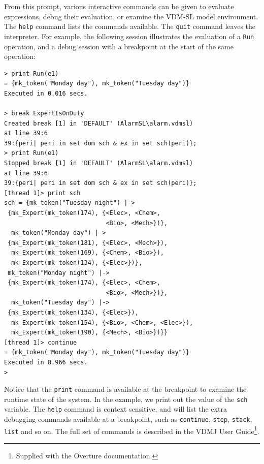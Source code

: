 {\noindent From this prompt, various interactive commands can be given
to evaluate expressions, debug their evaluation, or examine the
VDM-SL model environment.  The \verb|help| command lists the commands
available. The \verb|quit| command leaves the interpreter.
For example, the following session illustrates the evaluation of a
\verb|Run| operation, and a debug session with a breakpoint at the
start of the same operation:

\begin{lstlisting}
> print Run(e1)
= {mk_token("Monday day"), mk_token("Tuesday day")}
Executed in 0.016 secs.

> break ExpertIsOnDuty
Created break [1] in 'DEFAULT' (AlarmSL\alarm.vdmsl) 
at line 39:6
39:{peri| peri in set dom sch & ex in set sch(peri)};
> print Run(e1)
Stopped break [1] in 'DEFAULT' (AlarmSL\alarm.vdmsl) 
at line 39:6
39:{peri| peri in set dom sch & ex in set sch(peri)};
[thread 1]> print sch
sch = {mk_token("Tuesday night") |->
 {mk_Expert(mk_token(174), {<Elec>, <Chem>, 
                            <Bio>, <Mech>})},
  mk_token("Monday day") |->
 {mk_Expert(mk_token(181), {<Elec>, <Mech>}),
  mk_Expert(mk_token(169), {<Chem>, <Bio>}),
  mk_Expert(mk_token(134), {<Elec>})},
 mk_token("Monday night") |->
 {mk_Expert(mk_token(174), {<Elec>, <Chem>, 
                            <Bio>, <Mech>})},
  mk_token("Tuesday day") |->
 {mk_Expert(mk_token(134), {<Elec>}),
  mk_Expert(mk_token(154), {<Bio>, <Chem>, <Elec>}),
  mk_Expert(mk_token(190), {<Mech>, <Bio>})}}
[thread 1]> continue
= {mk_token("Monday day"), mk_token("Tuesday day")}
Executed in 8.966 secs. 
> 
\end{lstlisting}

\noindent Notice that the \verb|print| command is available at the
breakpoint to examine the runtime state of the system. In the example,
we print out the value of the \verb|sch| variable. The \verb|help|
command is context sensitive, and will list the extra debugging
commands available at a breakpoint, such as \verb|continue|,
\verb|step|, \verb|stack|, \verb|list| and so on. The full set of
commands is described in the VDMJ User Guide\footnote{Supplied with
the Overture documentation.}.

%
\lstset{style=mystyle}

}
